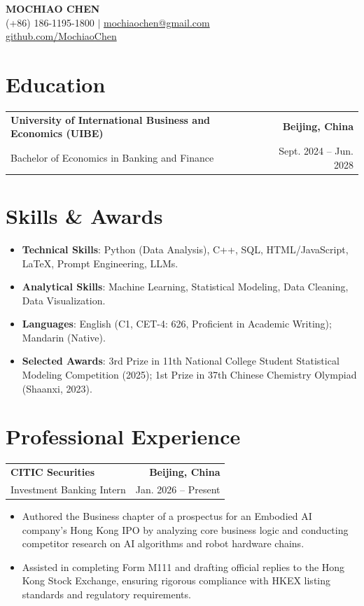 \documentclass[11pt,a4paper]{article}
\makeatletter
\newcommand{\resumeSubheading}[4]{
  \vspace{3pt}
  \begin{tabular*}{1.0\textwidth}[t]{l@{\extracolsep{\fill}}r}
    \textbf{#1} & \textbf{#2} \\
    {#3} & {#4} \\
  \end{tabular*}\vspace{-4pt}
}
\makeatother
\begin{document}
\begin{center}
    {\huge \textbf{MOCHIAO CHEN}} \\ \vspace{4pt}
    (+86) 186-1195-1800 $|$ \href{mailto:mochiaochen@gmail.com}{mochiaochen@gmail.com} \\ \vspace{2pt}
    \href{https://github.com/MochiaoChen}{github.com/MochiaoChen}
\end{center}

\section{Education}
\resumeSubheading
  {University of International Business and Economics (UIBE)}{Beijing, China}
  {Bachelor of Economics in Banking and Finance}{Sept. 2024 -- Jun. 2028}

\section{Skills \& Awards}
\begin{itemize}[leftmargin=0in, label={}]
  \item \textbf{Technical Skills}: Python (Data Analysis), C++, SQL, HTML/JavaScript, LaTeX, Prompt Engineering, LLMs.
  \item \textbf{Analytical Skills}: Machine Learning, Statistical Modeling, Data Cleaning, Data Visualization.
  \item \textbf{Languages}: English (C1, CET-4: 626, Proficient in Academic Writing); Mandarin (Native).
  \item \textbf{Selected Awards}: 3rd Prize in 11th National College Student Statistical Modeling Competition (2025); 1st Prize in 37th Chinese Chemistry Olympiad (Shaanxi, 2023).
\end{itemize}
\section{Professional Experience}
\resumeSubheading
  {CITIC Securities}{Beijing, China}
  {Investment Banking Intern}{Jan. 2026 -- Present}
\begin{itemize}
  \item Authored the Business chapter of a prospectus for an Embodied AI company's Hong Kong IPO by analyzing core business logic and conducting competitor research on AI algorithms and robot hardware chains.
  \item Assisted in completing Form M111 and drafting official replies to the Hong Kong Stock Exchange, ensuring rigorous compliance with HKEX listing standards and regulatory requirements.
\end{itemize}
\end{document}
